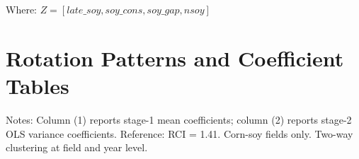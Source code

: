 \documentclass[12pt,letterpaper]{article}
\theoremstyle{remark}
\theoremstyle{plain}
\theoremstyle{definition}
\begin{document}
    Where: $Z = \left[late\_soy, soy\_cons,soy\_gap, nsoy\right]$
    
    

    
    
    


    
	\newpage
	

    \newpage
\clearpage
\appendix
 
\section{Rotation Patterns and Coefficient Tables}
\label{app:full_tables}
 
\begin{table}[H]
  \centering
  \caption{Just-Pope factor RCI: corn yield moments}
  \label{tab:corn_rci_jp}
  \begin{threeparttable}
    
    \begin{tablenotes}
      \small
      \item Notes: Column (1) reports stage-1 mean coefficients; column (2)
      reports stage-2 OLS variance coefficients. Reference: RCI = 1.41.
      Corn-soy fields only. Two-way clustering at field and year level.
    \end{tablenotes}
  \end{threeparttable}
\end{table}
 
\end{document}
